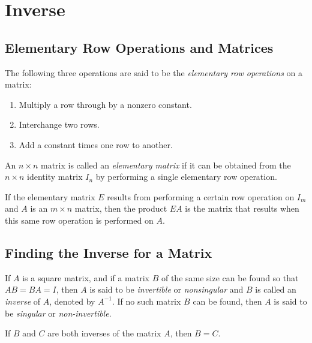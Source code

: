 \documentclass{report}
\begin{document}
	\section{Inverse}
		\subsection{Elementary Row Operations and Matrices}
		
		\begin{defn}
			The following three operations are said to be the \emph{elementary row operations} on a matrix:
			\begin{enumerate}
				\item Multiply a row through by a nonzero constant.
				\item Interchange two rows.
				\item Add a constant times one row to another.
			\end{enumerate}
		\end{defn}
		
		\begin{defn}
			An $n \times n$ matrix is called an \emph{elementary matrix} if it can be obtained from the $n \times n$ identity matrix $I_n$ by performing a single elementary row operation.
		\end{defn}
		
		\begin{thm}
			If the elementary matrix $E$ results from performing a certain row operation on $I_m$ and $A$ is an $m \times n$ matrix, then the product $EA$ is the matrix that results when this same row operation is performed on $A$.
		\end{thm}
		
		\subsection{Finding the Inverse for a Matrix}
		\begin{defn}[Inverse]
			If $A$ is a square matrix, and if a matrix $B$ of the same size can be found so that $AB=BA=I$, then $A$ is said to be \emph{invertible} or \emph{nonsingular} and $B$ is called an \emph{inverse} of $A$, denoted by $A^{-1}$. If no such matrix $B$ can be found, then $A$ is said to be \emph{singular} or \emph{non-invertible}.
		\end{defn}
		
		\begin{thm}
			If $B$ and $C$ are both inverses of the matrix $A$, then $B=C$.
		\end{thm}
		
\end{document}
